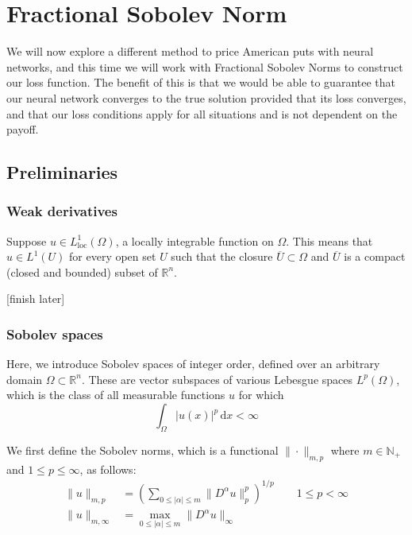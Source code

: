 \chapter{Fractional Sobolev Norm}

We will now explore a different method to price American puts with neural networks, and this time we will work with Fractional Sobolev Norms to construct our loss function. The benefit of this is that we would be able to guarantee that our neural network converges to the true solution provided that its loss converges, and that our loss conditions apply for all situations and is not dependent on the payoff.

\section{Preliminaries}

\subsection{Weak derivatives}

Suppose $u \in L_\text{loc}^1(\Omega)$, a locally integrable function on $\Omega$. This means that $u \in L^1(U)$ for every open set $U$ such that the closure $\overline U \subset \Omega$ and $\overline U$ is a compact (closed and bounded) subset of $\mathbb R^n$.

[finish later]

\subsection{Sobolev spaces}

Here, we introduce Sobolev spaces of integer order, defined over an arbitrary domain $\Omega \subset \mathbb R^n$. These are vector subspaces of various Lebesgue spaces $L^p(\Omega)$, which is the class of all measurable functions $u$ for which
$$\int_\Omega |u(x)|^p \,\mathrm dx < \infty$$

We first define the Sobolev norms, which is a functional $\|\cdot\|_{m, p}$ where $m \in \mathbb N_+$ and $1 \le p \le \infty$, as follows:
\begin{align*}
    \|u\|_{m, p} &= \left(\sum_{0 \le |\alpha|\le m} \|D^\alpha u\|^p_p\right)^{1/p} \qquad  1 \le p < \infty \\
    \|u\|_{m, \infty} &= \max_{0 \le |\alpha| \le m }\|D^\alpha u\|_\infty
\end{align*}

